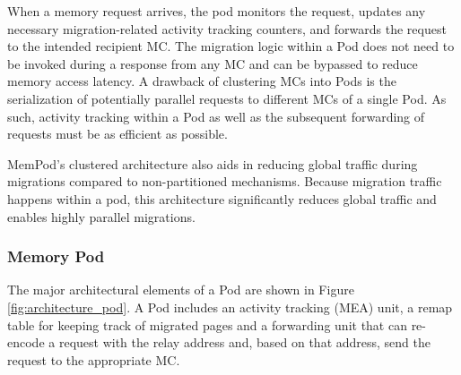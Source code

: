 When a memory request arrives, the pod monitors the request, updates any 
necessary migration-related activity tracking counters, and forwards 
the request to the intended recipient MC. The migration logic within a Pod does not need to be invoked during a response from any MC and can be bypassed to reduce memory access latency. A drawback of clustering MCs into Pods is the serialization of potentially parallel requests to different MCs of a single Pod. As such, activity tracking within a Pod as well as the subsequent forwarding of requests must be as efficient as possible. 

MemPod's clustered architecture also aids in reducing global traffic during migrations compared to non-partitioned mechanisms.  Because migration
traffic happens within a pod, this architecture significantly reduces global
traffic and enables highly parallel migrations.

\subsubsection*{Memory Pod}

The major architectural elements of a Pod are shown in Figure \ref{fig:architecture_pod}. A Pod includes an activity tracking (MEA) unit, a remap table for keeping track of migrated pages and a forwarding unit that can re-encode a request with the relay address and, based on that address, send the request to the appropriate MC.
%

